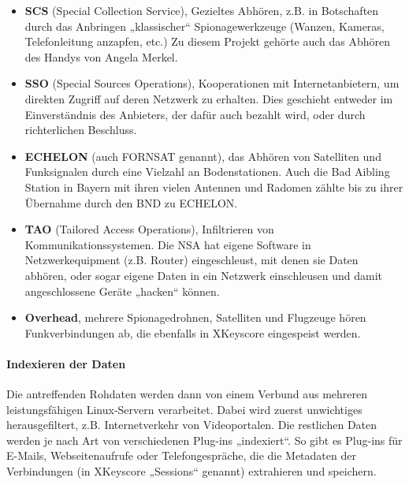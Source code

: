 \documentclass[12pt,a4paper]{scrartcl}
\begin{document}
\begin{itemize}
\item \textbf{SCS} (Special Collection Service), Gezieltes Abhören, z.B. in Botschaften durch das Anbringen „klassischer“ Spionagewerkzeuge (Wanzen, Kameras, Telefonleitung anzapfen, etc.)\cite{nsa_scs} Zu diesem Projekt gehörte auch das Abhören des Handys von Angela Merkel.\cite{golem_scs}

\item \textbf{SSO} (Special Sources Operations), Kooperationen mit Internetanbietern, um direkten Zugriff auf deren Netzwerk zu erhalten. Dies geschieht entweder im Einverständnis des Anbieters, der dafür auch bezahlt wird, oder durch richterlichen Beschluss.\cite{nsa_sso}

\item \textbf{ECHELON} (auch FORNSAT genannt), das Abhören von Satelliten und Funksignalen durch eine Vielzahl an Bodenstationen.\cite{eu_echelon} Auch die Bad Aibling Station in Bayern mit ihren vielen Antennen und Radomen zählte bis zu ihrer Übernahme durch den BND zu ECHELON.\cite{eu_echelon}

\item \textbf{TAO} (Tailored Access Operations), Infiltrieren von Kommunikationssystemen. Die NSA hat eigene Software in Netzwerkequipment (z.B. Router) eingeschleust, mit denen sie Daten abhören, oder sogar eigene Daten in ein Netzwerk einschleusen und damit angeschlossene Geräte „hacken“ können.\cite{schneier_tao}

\item \textbf{Overhead}, mehrere Spionagedrohnen, Satelliten und Flugzeuge hören Funkverbindungen ab, die ebenfalls in XKeyscore eingespeist werden.\cite{wiki_xkeyscore}
\end{itemize}
\cite{nsa_xkssources}

\paragraph{Indexieren der Daten}
Die antreffenden Rohdaten werden dann von einem Verbund aus mehreren leistungsfähigen Linux-Servern verarbeitet. Dabei wird zuerst unwichtiges herausgefiltert, z.B. Internetverkehr von Videoportalen.\cite{gchq_tempora} Die restlichen Daten werden je nach Art von verschiedenen Plug-ins „indexiert“. So gibt es Plug-ins für E-Mails, Webseitenaufrufe oder Telefongespräche, die die Metadaten der Verbindungen (in XKeyscore „Sessions“ genannt) extrahieren und speichern.\cite{nsa_xksguide}\cite{nsa_xkeyscore}
\end{document}
